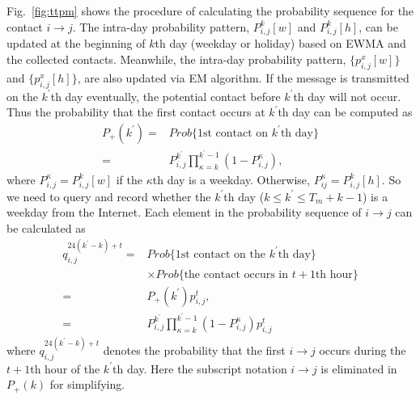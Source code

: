 Fig.~\ref{fig:ttpm} shows the procedure of
calculating the probability sequence for the contact $i \rightarrow j$.
The intra-day probability pattern, $P_{i,j}^{k}[w]$ and $P_{i,j}^{k}[h]$,
can be updated at the beginning of $k$th day (weekday or holiday)
based on EWMA and the collected contacts.
Meanwhile, the intra-day probability pattern,
$\{p_{i,j}^x[w]\}$ and $\{p_{i,j}^x[h]\}$,
are also updated via EM algorithm.
If the message is transmitted on the $k^{\prime}$th day eventually,
the potential contact before $k^{\prime}$th day will not occur.
Thus the probability that
the first contact occurs at $k^{\prime}$th day can be computed as
\begin{equation}
\label{eq:P_Cond}
\nonumber
\begin{aligned}
P_{+}(k^{\prime})
=& Prob\{\text{$1$st contact on $k^{\prime}$th day}\} \\
=& P^{k^{\prime}}_{i,j}\prod_{\kappa=k}^{k^{\prime}-1} (1-P^{\kappa}_{i,j}),
\end{aligned}
\end{equation}
where $P^{\kappa}_{i,j} = P^{k}_{i,j}[w]$
if the $\kappa$th day is a weekday.
Otherwise, $P^{\kappa}_{ij} = P^{k}_{i,j}[h]$.
So we need to query and record
whether the $k^{\prime}$th day ($k \le k^{\prime} \le T_m + k -1$) is a weekday
from the Internet.
Each element in the probability sequence of $i \rightarrow j$
can be calculated as
\begin{equation}
\begin{aligned}
q^{24(k^{\prime}-k)+t}_{i,j} = & Prob\{\text{$1$st contact on the $k^{\prime}$th day}\} \\
&\times Prob\{\text{the contact occurs in $t+1$th hour}\} \\
= & P_{+}(k^{\prime}) p_{i,j}^t,\\
= & P^{k^{\prime}}_{i,j}\prod_{\kappa=k}^{k^{\prime}-1}
(1-P^{\kappa}_{i,j}) p_{i,j}^t
\end{aligned}
\end{equation}
where $q^{24(k^{\prime}-k)+t}_{i,j}$ denotes the probability
that the first $i \rightarrow j$ occurs
during the $t+1$th hour of the $k^{\prime}$th day.
Here the subscript notation $i \rightarrow j$ is eliminated
in $P_{+}(k)$ for simplifying.

